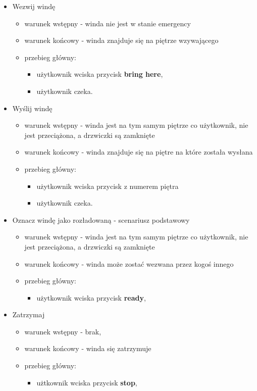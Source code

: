 \documentclass[a4paper,11pt]{article}
\begin{document}
	\begin{itemize}
		\item Wezwij windę
		\begin{itemize}
			\item warunek wstępny - winda nie jest w stanie emergency
			\item warunek końcowy - winda znajduje się na piętrze wzywającego
			\item przebieg główny:
			\begin{itemize}
				\item użytkownik wciska przycisk \textbf{bring here},
				\item użytkownik czeka.
			\end{itemize}
		\end{itemize}
		\item Wyślij windę
		\begin{itemize}
			\item warunek wstępny - winda jest na tym samym piętrze co użytkownik, nie jest przeciążona, a drzwiczki są zamknięte
			\item warunek końcowy - winda znajduje się na piętre na które została wysłana
			\item przebieg główny:
			\begin{itemize}
				\item użytkownik wciska przycisk z numerem piętra
				\item użytkownik czeka.
			\end{itemize}
		\end{itemize}
		\item Oznacz windę jako rozładowaną - scenariusz podstawowy
		\begin{itemize}
			\item warunek wstępny - winda jest na tym samym piętrze co użytkownik, nie jest przeciążona, a drzwiczki są zamknięte
			\item warunek końcowy - winda może zostać wezwana przez kogoś innego
			\item przebieg główny:
			\begin{itemize}
				\item użytkownik wciska przycisk \textbf{ready},
			\end{itemize}
	
		\end{itemize}

		\item Zatrzymaj 
		\begin{itemize}
			\item warunek wstępny - brak,
			\item warunek końcowy - winda się zatrzymuje
			\item przebieg główny:
			\begin{itemize}
				\item użtkownik wciska przycisk \textbf{stop},
			\end{itemize}
		\end{itemize}
		

\end{itemize}
\end{document}
